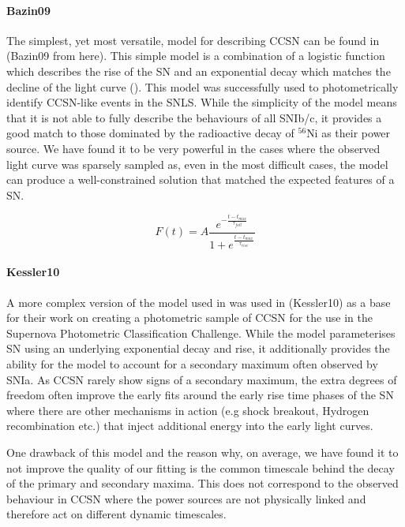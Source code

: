 \paragraph{Bazin09}
The simplest, yet most versatile, model for describing CCSN can be found in \citet{Bazin2009} (Bazin09 from here). This simple model is a combination of a logistic function which describes the rise of the SN and an exponential decay which matches the decline of the light curve (). This model was successfully used to photometrically identify CCSN-like events in the SNLS. While the simplicity of the model means that it is not able to fully describe the behaviours of all SNIb/c, it provides a good match to those dominated by the radioactive decay of $^{56}$Ni as their power source. We have found it to be very powerful in the cases where the observed light curve was sparsely sampled as, even in the most difficult cases, the model can produce a well-constrained solution that matched the expected features of a SN.

\begin{equation}
\label{eq:Bazin09}
  F(t) = A \frac{e^{-\frac{t - t_{max}}{\tau_{fall}}}} {1 + e^{\frac{t - t_{max}}{\tau_{rise}}}}
\end{equation}

\paragraph{Kessler10}
A more complex version of the model used in \citet{Bazin2009} was used in \citet{Kessler2010} (Kessler10) as a base for their work on creating a photometric sample of CCSN for the use in the Supernova Photometric Classification Challenge. While the model parameterises SN using an underlying exponential decay and rise, it additionally provides the ability for the model to account for a secondary maximum often observed by SNIa. As CCSN rarely show signs of a secondary maximum, the extra degrees of freedom often improve the early fits around the early rise time phases of the SN where there are other mechanisms in action (e.g shock breakout, Hydrogen recombination etc.) that inject additional energy into the early light curves.

One drawback of this model and the reason why, on average, we have found it to not improve the quality of our fitting is the common timescale behind the decay of the primary and secondary maxima. This does not correspond to the observed behaviour in CCSN where the power sources are not physically linked and therefore act on different dynamic timescales.

